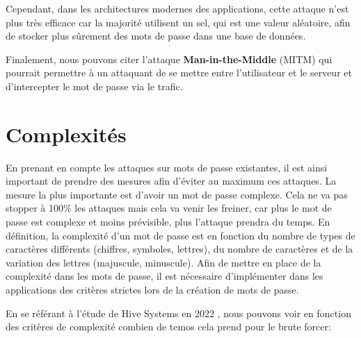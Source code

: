 Cependant, dans les architectures modernes des applications, cette attaque n'est plus très efficace car la majorité utilisent un sel, qui est une valeur aléatoire, afin de stocker plus sûrement des mots de passe dans une base de données.

Finalement, nous pouvons citer l'attaque \textbf{Man-in-the-Middle} (MITM) qui pourrait permettre à un attaquant de se mettre entre l'utilisateur et le serveur et d'intercepter le mot de passe via le trafic.
\section{Complexités}

En prenant en compte les attaques sur mots de passe existantes, il est ainsi important de prendre des mesures afin d'éviter au maximum ces attaques. La mesure la plus importante est d'avoir un mot de passe complexe. Cela ne va pas stopper à 100\% les attaques mais cela va venir les freiner, car plus le mot de passe est complexe et moins prévisible, plus l'attaque prendra du temps. En définition, la complexité d'un mot de passe est en fonction du nombre de types de caractères différents (chiffres, symboles, lettres), du nombre de caractères et de la variation des lettres (majuscule, minuscule). Afin de mettre en place de la complexité dans les mots de passe, il est nécessaire d'implémenter dans les applications des critères strictes lors de la création de mots de passe. 

En se référant à l'étude de Hive Systems en 2022 \cite{hives}, nous pouvons voir en fonction des critères de complexité combien de temos cela prend pour le brute forcer:

